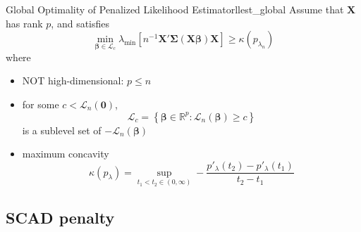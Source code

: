 \documentclass[twoside]{article}
\begin{document}
\begin{proposition}{Global Optimality of Penalized Likelihood Estimator}{llest_global}
    Assume that $\mathbf{X}$ has rank $p$, and satisfies 
    $$
    \min_{\boldsymbol{\beta}\in \mathcal{L}_c} \lambda_{\min} \left[n^{-1} \mathbf{X}'\boldsymbol{\Sigma}(\mathbf{X}\boldsymbol{\beta})\mathbf{X} \right] \geq \kappa(p_{\lambda_n})
    $$
    where 
    \begin{itemize}
        \item NOT high-dimensional: $p\leq n$
        \item for some $c< \mathcal{L}_n (\mathbf{0})$, $$ \mathcal{L}_c = \left\{ \boldsymbol{\beta}\in \mathbb{R}^p: \mathcal{L}_n(\boldsymbol{\beta})\geq c \right\} $$ is a sublevel set of $-\mathcal{L}_n(\boldsymbol{\beta})$
        \item maximum concavity $$ \kappa(p_{\lambda}) = \sup_{t_1<t_2\in(0,\infty)}-\frac{p'_{\lambda}(t_2)-p'_{\lambda}(t_1)}{t_2-t_1} $$
    \end{itemize}
\end{proposition}

\subsection{SCAD penalty}
\end{document}
